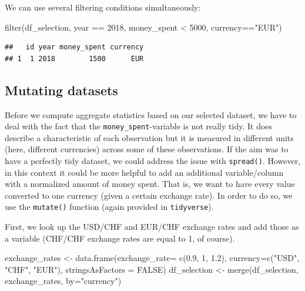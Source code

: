 \documentclass[
  12pt,
]{style/krantz}
\newenvironment{Shaded}{\begin{snugshade}}{\end{snugshade}}
\newcommand{\AttributeTok}[1]{\textcolor[rgb]{0.77,0.63,0.00}{#1}}
\newcommand{\ConstantTok}[1]{\textcolor[rgb]{0.00,0.00,0.00}{#1}}
\newcommand{\DecValTok}[1]{\textcolor[rgb]{0.00,0.00,0.81}{#1}}
\newcommand{\FloatTok}[1]{\textcolor[rgb]{0.00,0.00,0.81}{#1}}
\newcommand{\FunctionTok}[1]{\textcolor[rgb]{0.00,0.00,0.00}{#1}}
\newcommand{\NormalTok}[1]{#1}
\newcommand{\OtherTok}[1]{\textcolor[rgb]{0.56,0.35,0.01}{#1}}
\newcommand{\SpecialCharTok}[1]{\textcolor[rgb]{0.00,0.00,0.00}{#1}}
\newcommand{\StringTok}[1]{\textcolor[rgb]{0.31,0.60,0.02}{#1}}
\begin{document}
We can use several filtering conditions simultaneously:

\begin{Shaded}
\begin{Highlighting}[]
\FunctionTok{filter}\NormalTok{(df\_selection, year }\SpecialCharTok{==} \DecValTok{2018}\NormalTok{, money\_spent }\SpecialCharTok{\textless{}} \DecValTok{5000}\NormalTok{, currency}\SpecialCharTok{==}\StringTok{"EUR"}\NormalTok{)}
\end{Highlighting}
\end{Shaded}

\begin{verbatim}
##   id year money_spent currency
## 1  1 2018        1500      EUR
\end{verbatim}

\hypertarget{mutating-datasets}{%
\subsection{Mutating datasets}\label{mutating-datasets}}

Before we compute aggregate statistics based on our selected dataset, we have to deal with the fact that the \texttt{money\_spent}-variable is not really tidy. It does describe a characteristic of each observation but it is measured in different units (here, different currencies) across some of these observations. If the aim was to have a perfectly tidy dataset, we could address the issue with \texttt{spread()}. However, in this context it could be more helpful to add an additional variable/column with a normalized amount of money spent. That is, we want to have every value converted to one currency (given a certain exchange rate). In order to do so, we use the \texttt{mutate()} function (again provided in \texttt{tidyverse}).

First, we look up the USD/CHF and EUR/CHF exchange rates and add those as a variable (CHF/CHF exchange rates are equal to 1, of course).

\begin{Shaded}
\begin{Highlighting}[]
\NormalTok{exchange\_rates }\OtherTok{\textless{}{-}} \FunctionTok{data.frame}\NormalTok{(}\AttributeTok{exchange\_rate=} \FunctionTok{c}\NormalTok{(}\FloatTok{0.9}\NormalTok{, }\DecValTok{1}\NormalTok{, }\FloatTok{1.2}\NormalTok{),}
                             \AttributeTok{currency=}\FunctionTok{c}\NormalTok{(}\StringTok{"USD"}\NormalTok{, }\StringTok{"CHF"}\NormalTok{, }\StringTok{"EUR"}\NormalTok{), }\AttributeTok{stringsAsFactors =} \ConstantTok{FALSE}\NormalTok{)}
\NormalTok{df\_selection }\OtherTok{\textless{}{-}} \FunctionTok{merge}\NormalTok{(df\_selection, exchange\_rates, }\AttributeTok{by=}\StringTok{"currency"}\NormalTok{)}
\end{Highlighting}
\end{Shaded}
\end{document}
